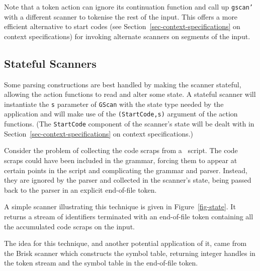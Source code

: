 
Note that a token action can ignore its continuation function and call up
\mbox{\tt gscan'} with a different scanner to tokenise the rest of the input.  This
offers a more efficient alternative to start codes (see
Section~\ref{sec-context-specifications} on context specifications) for
invoking alternate scanners on segments of the input.


\subsection{Stateful Scanners}
\label{sec-stateful-scanners}

Some parsing constructions are best handled by making the scanner stateful,
allowing the action functions to read and alter some state.  A stateful scanner
will instantiate the \mbox{\tt s} parameter of \mbox{\tt GScan} with the state type needed by the
application and will make use of the \mbox{\tt (StartCode,s)} argument of the action
functions.  (The \mbox{\tt StartCode} component of the scanner's state will be dealt
with in Section~\ref{sec-context-specifications} on context specifications.)

Consider the problem of collecting the code scraps from a \lx\ script.  The
code scraps could have been included in the grammar, forcing them to appear at
certain points in the script and complicating the grammar and parser.  Instead,
they are ignored by the parser and collected in the scanner's state, being
passed back to the parser in an explicit end-of-file token.

A simple scanner illustrating this technique is given in
Figure~\ref{fig-state}.  It returns a stream of identifiers terminated with an
end-of-file token containing all the accumulated code scraps on the input.

The idea for this technique, and another potential application of it, came from
the Brisk scanner which constructs the symbol table, returning integer handles
in the token stream and the symbol table in the end-of-file token.

